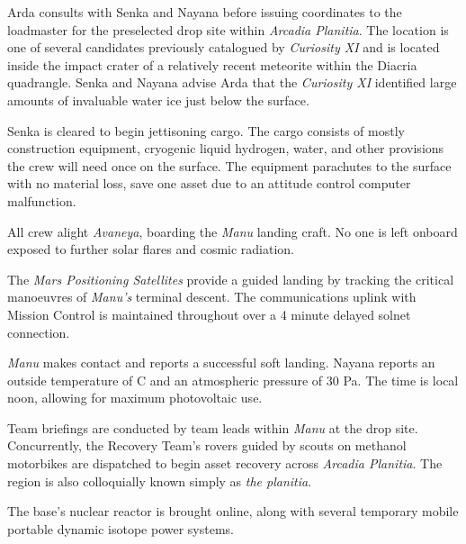

Arda consults with Senka and Nayana before issuing coordinates to the loadmaster for the preselected drop site within {\it Arcadia Planitia}. The location is one of several candidates previously catalogued by {\it Curiosity XI} and is located inside the impact crater of a relatively recent meteorite within the Diacria quadrangle. Senka and Nayana advise Arda that the {\it Curiosity XI} identified large amounts of invaluable water ice just below the surface. 

Senka is cleared to begin jettisoning cargo. The cargo consists of mostly construction equipment, cryogenic liquid hydrogen, water, and other provisions the crew will need once on the surface. The equipment parachutes to the surface with no material loss, save one asset due to an attitude control computer malfunction.
\StopTimelineDate

All crew alight {\it Avaneya}, boarding the {\it Manu} landing craft. No one is left onboard exposed to further solar flares and cosmic radiation.

The {\it Mars Positioning Satellites} provide a guided landing by tracking the critical manoeuvres of {\it Manu's} terminal descent. The communications uplink with Mission Control is maintained throughout over a 4 minute delayed solnet connection.

{\it Manu} makes contact and reports a successful soft landing. Nayana reports an outside temperature of C and an atmospheric pressure of 30 Pa. The time is local noon, allowing for maximum photovoltaic use.

Team briefings are conducted by team leads within {\it Manu} at the drop site. Concurrently, the Recovery Team's rovers guided by scouts on methanol motorbikes are dispatched to begin asset recovery across {\it Arcadia Planitia}. The region is also colloquially known simply as {\it the planitia}.

The base's nuclear reactor is brought online, along with several temporary mobile portable dynamic isotope power systems.

